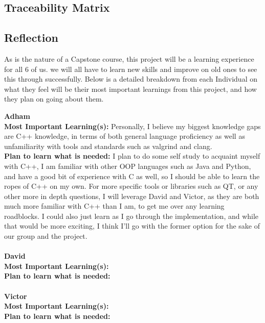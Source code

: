 \documentclass[12pt]{article}
\begin{document}
\subsection{Traceability Matrix}

\subsection{Reflection}

As is the nature of a Capstone course, this project will be a learning experience for all 6 of us. we will all have to learn new skills and improve on old ones to see this 
through successfully. Below is a detailed breakdown from each Individual on what they feel will be their most important learnings from this project, and how they plan on
going about them.

\noindent\textbf{Adham}\\
\textbf{Most Important Learning(s):} Personally, I believe my biggest knowledge gaps are C++ knowledge, in terms of both general language proficiency as well as unfamiliarity
with tools and standards such as valgrind and clang.\\
\textbf{Plan to learn what is needed:} I plan to do some self study to acquaint myself with C++, I am familiar with other OOP languages such as Java and Python, and have a good
bit of experience with C as well, so I should be able to learn the ropes of C++ on my own. For more specific tools or libraries such as QT, or any other more in depth questions,
I will leverage David and Victor, as they are both much more familiar with C++ than I am, to get me over any learning roadblocks. I could also just learn as I go through the
implementation, and while that would be more exciting, I think I'll go with the former option for the sake of our group and the project.\\\\

\noindent\textbf{David}\\
\textbf{Most Important Learning(s):}\\
\textbf{Plan to learn what is needed:}\\\\

\noindent\textbf{Victor}\\
\textbf{Most Important Learning(s):}\\
\textbf{Plan to learn what is needed:}\\\\
\end{document}
